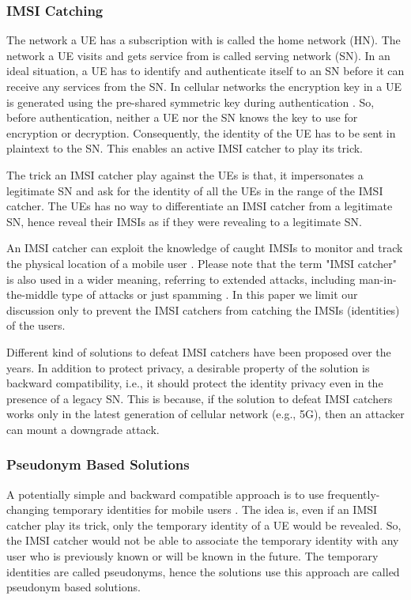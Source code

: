 \documentclass{llncs} %
\begin{document}
\subsubsection{IMSI Catching}
The network a UE has a subscription with is called the home network (HN). The network a UE visits and gets service from is called serving network (SN). In an ideal situation, a UE has to identify and authenticate itself to an SN before it can receive any services from the SN. In cellular networks the encryption key in a UE is generated using the pre-shared symmetric key during authentication \cite{TS33401}. So, before authentication, neither a UE nor the SN knows the key to use for encryption or decryption.  Consequently, the identity of the UE has to be sent in plaintext to the SN. This enables an active IMSI catcher to play its trick.

The trick an IMSI catcher play against the UEs is that, it impersonates a legitimate SN and ask for the identity of all the UEs in the range of the IMSI catcher. The UEs has no way to differentiate an IMSI catcher from a legitimate SN, hence reveal their IMSIs as if they were revealing to a legitimate SN. 

An IMSI catcher can exploit the knowledge of caught IMSIs to monitor and track the physical location of a mobile user \cite{tracking_bins,goldman2007mobile}. Please note that the term "IMSI catcher" is also used in a wider meaning, referring to extended attacks, including man-in-the-middle type of attacks or just spamming \cite{catch_me_if_you_can,chinese_spam}. In this paper we limit our discussion only to prevent the IMSI catchers from catching the IMSIs (identities) of the users.

Different kind of solutions to defeat IMSI catchers have been proposed over the years. In addition to protect privacy, a desirable property of the solution is backward compatibility, i.e., it should protect the identity privacy even in the presence of a legacy SN. This is because, if the solution to defeat IMSI catchers works only in the latest generation of cellular network (e.g., 5G), then an attacker can mount a downgrade attack. 

\subsubsection{Pseudonym Based Solutions}
A potentially simple and backward compatible approach is to use frequently-changing temporary identities for mobile users \cite{CCS15,SSR15,Ginzboorg_Niemi_2016,Norrman_Naslund_Dubrova_2016,yemen2017}. The idea is, even if an IMSI catcher play its trick, only the temporary identity of a UE would be revealed. So, the IMSI catcher would not be able to associate the temporary identity with any user who is previously known or will be known in the future. The temporary identities are called pseudonyms, hence the solutions use this approach are called pseudonym based solutions. 
\end{document}
